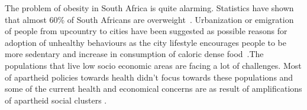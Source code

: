 The problem of obesity in South Africa is quite alarming. Statistics have shown that almost 60\% of South Africans are overweight~\citep{ng:global}. Urbanization or emigration of people from upcountry to cities  have been suggested as possible reasons for adoption of unhealthy behaviours as the city lifestyle encourages people to be more sedentary and increase in consumption of caloric dense food~\citep{ali2009factors}.The populations that live low socio economic areas are facing a lot of challenges. Most of apartheid policies towards health didn't focus towards these populations and some of the current health and economical concerns are as result of amplifications of apartheid social clusters \citep{benatar2013challenges}.

    


\begin{flushright}
\end{flushright}
